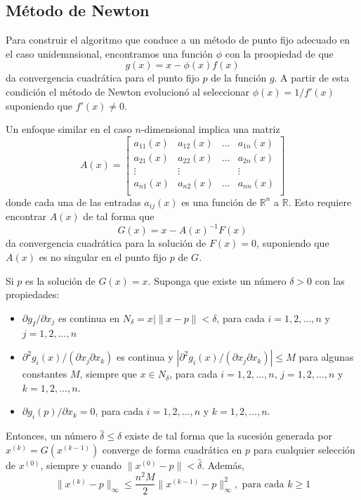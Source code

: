 \subsection{Método de Newton}
Para construir el algoritmo que conduce a un método de punto fijo adecuado en el caso unidemnsional, encontramos una función $\phi$ con la proopiedad de que 
\[ g(x) = x - \phi(x) f(x) \]
da convergencia cuadrática para el punto fijo $p$ de la función $g$. A partir de esta condición el método de Newton evolucionó al seleccionar $\phi(x) = 1 / f'(x)$ suponiendo que $f'(x) \neq 0$.

Un enfoque similar en el caso $n$-dimensional implica una matriz
\begin{equation}
    A(x) = 
    \begin{bmatrix}
        a_{11}(x) & a_{12}(x) & \dots & a_{1n}(x) \\
        a_{21}(x) & a_{22}(x) & \dots & a_{2n}(x) \\
        \vdots & \vdots & & \vdots \\
        a_{n1}(x) & a_{n2}(x) & \dots & a_{nn}(x) \\
    \end{bmatrix}
\end{equation}
donde cada una de las entradas $a_{ij}(x)$ es una función de $\mathbb{R}^n$ a $\mathbb{R}$. Esto requiere encontrar $A(x)$ de tal forma que 
\[ G(x) = x - A(x)^{-1} F(x) \]
da convergencia cuadrática para la solución de $F(x) = 0$, suponiendo que $A(x)$ es no singular en el punto fijo $p$ de $G$.

\begin{theorem}
    \label{teo: Metodo de Newton Sistemas}
    Si $p$ es la solución de $G(x) = x$. Suponga que existe un número $\delta > 0$ con las propiedades:
    \begin{itemize}
        \item $\partial g_I / \partial x_j$ es continua en $N_\delta = {x | \|x - p\| < \delta}$, para cada $i = 1, 2, ..., n$ y $j = 1, 2, ..., n$
        \item $\partial^2g_i(x) / (\partial x_j \partial x_k)$ es continua y $| \partial^2g_i(x) / (\partial x_j \partial x_k) | \leq M$  para algunas constantes $M$, siempre que $x \in N_\delta$, para cada $i = 1, 2, ..., n$, $j = 1, 2, ..., n$ y $k = 1, 2, ..., n$.
        \item $\partial g_i(p) / \partial x_k = 0$, para cada $i = 1, 2, ..., n$ y $k = 1, 2, ..., n$.
    \end{itemize}
    Entonces, un número $\hat{\delta} \leq \delta$ existe de tal forma que la sucesión generada por $x^{(k)} = G(x^{(k - 1)})$ converge de forma cuadrática en $p$ para cualquier selección de $x^{(0)}$, siempre y cuando $\| x^{(0)} - p \| < \hat{\delta}$. Además,
    \[ \|x^{(k)} - p\|_\infty \leq \frac{n^2 M}{2} \| x^{(k - 1)} - p \|^2_\infty, \text{ para cada } k \geq 1 \]
\end{theorem}

